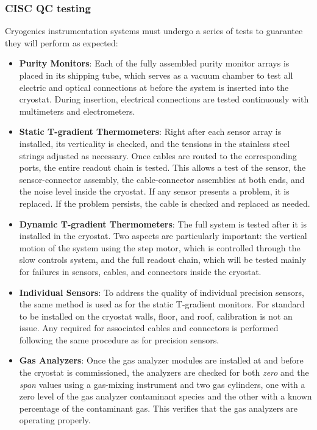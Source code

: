 \subsubsection{CISC QC testing}

Cryogenics instrumentation systems must undergo a series of tests to guarantee they will perform as expected:  

\begin{itemize}
\item {\bf Purity Monitors}: Each of the fully assembled purity monitor arrays is placed in its shipping tube, which serves as a vacuum chamber to test all electric and optical connections at \surf before the system is inserted into the cryostat. During insertion, electrical connections are tested continuously with multimeters and electrometers.

\item {\bf Static T-gradient Thermometers}: Right after each sensor array is installed, its verticality 
is checked, and the tensions in the stainless steel strings adjusted as necessary. Once cables are routed to the corresponding  ports, the entire readout chain is tested. This allows a test of the sensor, the sensor-connector assembly, the cable-connector assemblies at both ends, and the noise level inside the cryostat.
If any sensor presents a problem, it is replaced. If the problem persists, the cable is checked and replaced as needed.

\item {\bf Dynamic T-gradient Thermometers}: The full system is tested after it is installed in the cryostat. Two aspects are particularly important: the vertical motion of the system using the step motor, which is controlled through the slow controls system, and the full readout chain, which will be tested mainly for failures in sensors, cables, and connectors inside the cryostat. 

\item {\bf Individual Sensors}: To address the quality of individual precision sensors, the same method is used as for
the static T-gradient monitors. For standard  to be installed on the cryostat walls, floor, and roof, calibration is not an issue. Any  required for associated cables and connectors is performed following the same procedure as for precision sensors.

\item {\bf Gas Analyzers}: Once the gas analyzer modules are installed at \surf and before the cryostat is commissioned, the analyzers 
are checked for both \textit{zero} and the \textit{span} values using a gas-mixing instrument and two gas cylinders, one with a
zero level of the gas analyzer contaminant species and the other with a known percentage of the contaminant gas. This verifies that the gas analyzers are operating properly. 


\end{itemize}
